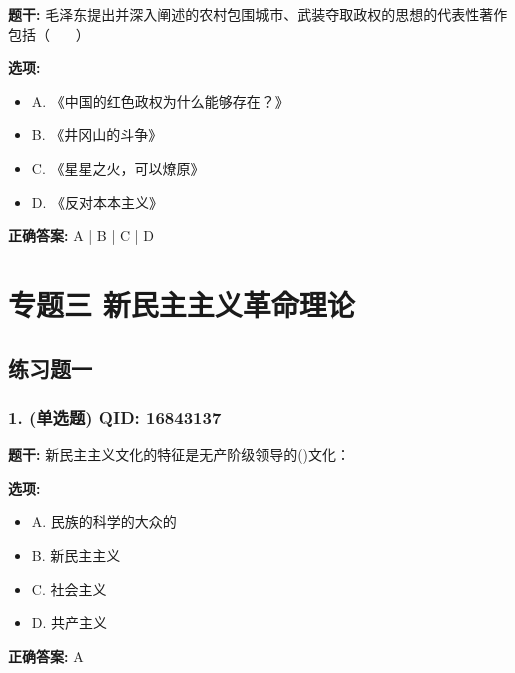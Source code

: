 \documentclass[12pt,UTF8]{ctexart}
\begin{document}
\textbf{题干:}
毛泽东提出并深入阐述的农村包围城市、武装夺取政权的思想的代表性著作包括（    ）

\textbf{选项:}
\begin{itemize}[leftmargin=*]

  \item A. 《中国的红色政权为什么能够存在？》

  \item B. 《井冈山的斗争》

  \item C. 《星星之火，可以燎原》

  \item D. 《反对本本主义》

\end{itemize}

\textbf{正确答案:}
A | B | C | D

\vspace{0.3em}\hrulefill\vspace{0.7em}

\section*{专题三 新民主主义革命理论}
\hrulefill

\subsection*{练习题一}

\subsubsection*{1. (单选题) \small QID: 16843137}

\textbf{题干:}
新民主主义文化的特征是无产阶级领导的()文化：

\textbf{选项:}
\begin{itemize}[leftmargin=*]

  \item A. 民族的科学的大众的

  \item B. 新民主主义

  \item C. 社会主义

  \item D. 共产主义

\end{itemize}

\textbf{正确答案:}
A

\vspace{0.3em}\hrulefill\vspace{0.7em}
\end{document}
